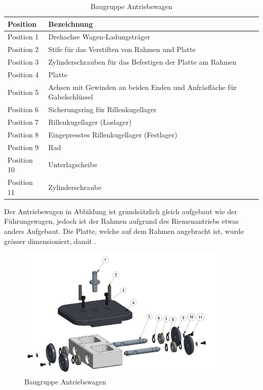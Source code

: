 \documentclass[../../main.tex]{subfiles}
\begin{document}
\begin{table}[H]
    \begin{table}[H] \centering
        \begin{tabular}{|l|l|}
        \hline
        \textbf{Position} & \textbf{Bezeichnung}\\
        \hline
        Position 1          & Drehachse Wagen-Ladungsträger\\
         \hline
        Position 2          & Stife für das Verstiften von Rahmen und Platte\\
        \hline
        Position 3          & Zylinderschrauben für das Befestigen der Platte am Rahmen\\
        \hline
        Position 4          & Platte\\
        \hline
        Position 5          & Achsen mit Gewinden an beiden Enden und Anfräsfläche für Gabelschlüssel\\
        \hline
        Position 6          & Sicherungsring für Rillenkugellager\\
        \hline
        Position 7          & Rillenkugellager (Loslager)\\
        \hline
        Position 8          & Eingepresstes Rillenkugellager (Festlager)\\
        \hline
        Position 9          & Rad\\
        \hline
        Position 10         & Unterlagscheibe\\
        \hline
        Position 11         & Zylinderschraube\\
        \hline
        \end{tabular}

    Der Antriebswagen in Abbildung ist grundsätzlich gleich aufgebaut wie der Führungswagen, jedoch ist der Rahmen aufgrund des Riemenantriebs etwas anders Aufgebaut. Die Platte, welche auf dem Rahmen angebracht ist, wurde grösser dimensioniert, damit  . 

    \begin{figure}[H] %
        \centering
        \includegraphics[width=0.9\textwidth]{Fuehrungswagen.png}
        \caption{Baugruppe Antriebswagen}
        \label{fig:Antriebswagen}
    \end{figure} 


\end{table}
\end{table}
\end{document}
